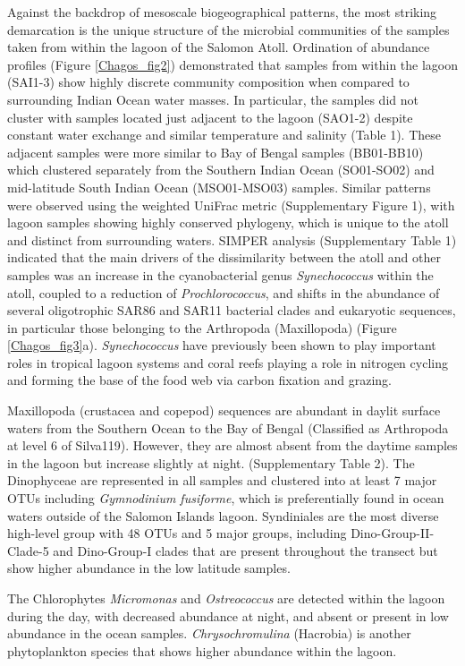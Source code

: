 Against the backdrop of mesoscale biogeographical patterns, the most striking demarcation is the unique structure of the microbial communities of the samples taken from within the lagoon of the Salomon Atoll. Ordination of abundance profiles (Figure \ref{Chagos_fig2}) demonstrated that samples from within the lagoon (SAI1-3) show highly discrete community composition when compared to surrounding Indian Ocean water masses. In particular, the samples did not cluster with samples located just adjacent to the lagoon (SAO1-2) despite constant water exchange and similar temperature and salinity (Table 1). These adjacent samples were more similar to Bay of Bengal samples (BB01-BB10) which clustered separately from the Southern Indian Ocean (SO01-SO02) and mid-latitude South Indian Ocean (MSO01-MSO03) samples. Similar patterns were observed using the weighted UniFrac metric (Supplementary Figure 1), with lagoon samples showing highly conserved phylogeny, which is unique to the atoll and distinct from surrounding waters. SIMPER analysis (Supplementary Table 1) indicated that the main drivers of the dissimilarity between the atoll and other samples was an increase in the cyanobacterial genus {\em Synechococcus} within the atoll, coupled to a reduction of {\em Prochlorococcus}, and shifts in the abundance of several oligotrophic SAR86 and SAR11 bacterial clades and eukaryotic sequences, in particular those belonging to the Arthropoda (Maxillopoda) (Figure \ref{Chagos_fig3}a). {\em Synechococcus} have previously been shown to play important roles in tropical lagoon systems and coral reefs playing a role in nitrogen cycling and forming the base of the food web via carbon fixation and grazing. \cite{charpy_importance_2005}

Maxillopoda (crustacea and copepod) sequences are abundant in daylit surface waters from the Southern Ocean to the Bay of Bengal (Classified as Arthropoda at level 6 of Silva119). However, they are almost absent from the daytime samples in the lagoon but increase slightly at night. (Supplementary Table 2). The Dinophyceae are represented in all samples and clustered into at least 7 major OTUs including {\em Gymnodinium fusiforme}, which is preferentially found in ocean waters outside of the Salomon Islands lagoon. Syndiniales are the most diverse high-level group with 48 OTUs and 5 major groups, including Dino-Group-II-Clade-5 and Dino-Group-I clades that are present throughout the transect but show higher abundance in the low latitude samples.

The Chlorophytes {\em Micromonas} and {\em Ostreococcus} are detected within the lagoon during the day, with decreased abundance at night, and absent or present in low abundance in the ocean samples. {\em Chrysochromulina} (Hacrobia) is another phytoplankton species that shows higher abundance within the lagoon.

